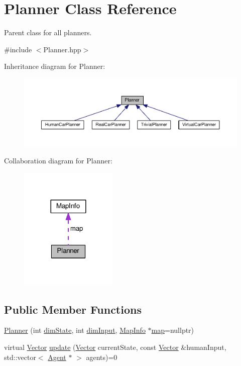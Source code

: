 \hypertarget{classPlanner}{}\section{Planner Class Reference}
\label{classPlanner}


Parent class for all planners.  




{\ttfamily \#include $<$Planner.\+hpp$>$}



Inheritance diagram for Planner\+:\nopagebreak
\begin{figure}[H]
\begin{center}
\leavevmode
\includegraphics[width=350pt]{classPlanner__inherit__graph}
\end{center}
\end{figure}


Collaboration diagram for Planner\+:\nopagebreak
\begin{figure}[H]
\begin{center}
\leavevmode
\includegraphics[width=132pt]{classPlanner__coll__graph}
\end{center}
\end{figure}
\subsection*{Public Member Functions}
\begin{DoxyCompactItemize}
\item 
\hyperlink{classPlanner_a010db2180841d3773eff05c3a760b029}{Planner} (int \hyperlink{classPlanner_a70081990e0749d5347190d37022c30f1}{dim\+State}, int \hyperlink{classPlanner_a4e6f8082d82e17c5821e26e12ab72421}{dim\+Input}, \hyperlink{classMapInfo}{Map\+Info} $\ast$\hyperlink{classPlanner_ab651f7a11072a2588bbb7683660b519e}{map}=nullptr)
\item 
virtual \hyperlink{Agent_8hpp_a5dd127bb3cb18b011cf5fd80a906e830}{Vector} \hyperlink{classPlanner_a62e1434402a3f36b0883e069a10447d8}{update} (\hyperlink{Agent_8hpp_a5dd127bb3cb18b011cf5fd80a906e830}{Vector} current\+State, const \hyperlink{Agent_8hpp_a5dd127bb3cb18b011cf5fd80a906e830}{Vector} \&human\+Input, std\+::vector$<$ \hyperlink{classAgent}{Agent} $\ast$ $>$ agents)=0
\end{DoxyCompactItemize}
